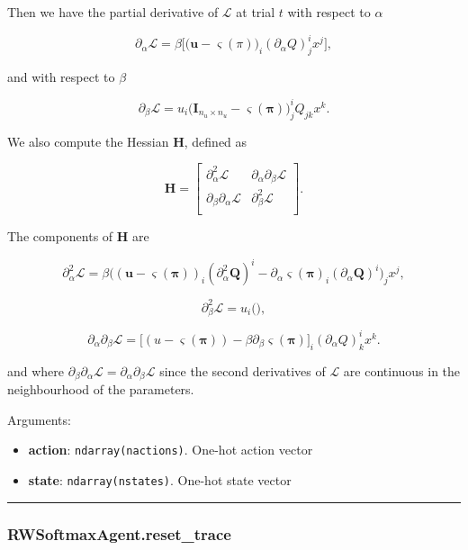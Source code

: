 Then we have the partial derivative of \(\mathcal L\) at trial \(t\)
with respect to \(\alpha\)

\[
\partial_{\alpha} \mathcal L = \beta \Big[ \big(\mathbf u - \varsigma(\pi)\big)_i (\partial_{\alpha} Q)^i_j x^j \Big],
\]

and with respect to \(\beta\)

\[
\partial_{\beta} \mathcal L = u_i \Big(\mathbf I_{n_u \times n_u} - \varsigma(\boldsymbol\pi)\Big)^i_j Q_{jk} x^k.
\]

We also compute the Hessian \(\mathbf H\), defined as

\[
\mathbf H = \left[
\begin{array}{cc}
\partial^2_{\alpha} \mathcal L & \partial_{\alpha} \partial_{\beta} \mathcal L \\
\partial_{\beta} \partial_{\alpha} \mathcal L & \partial^2_{\beta} \mathcal L \\
\end{array}\right].
\]

The components of \(\mathbf H\) are

\[
\partial^2_{\alpha} \mathcal L = \beta \Big( (\mathbf u - \varsigma(\boldsymbol\pi))_i (\partial^2_\alpha \mathbf Q)^i - \partial_{\alpha} \varsigma(\boldsymbol\pi)_i (\partial_{\alpha} \mathbf Q)^i \Big)_j x^j,
\]

\[
\partial^2_{\beta} \mathcal L = u_i \Big( \Big),
\]

\[
\partial_{\alpha} \partial_{\beta} \mathcal L = \Bigg[ (u - \varsigma(\boldsymbol\pi)) - \beta \partial_{\beta} \varsigma(\boldsymbol\pi) \Bigg]_i (\partial_{\alpha} Q)^i_k x^k.
\]

and where
\(\partial_{\beta} \partial_{\alpha} \mathcal L = \partial_{\alpha} \partial_{\beta} \mathcal L\)
since the second derivatives of \(\mathcal L\) are continuous in the
neighbourhood of the parameters.

Arguments:

\begin{itemize}
\tightlist
\item
  \textbf{action}: \texttt{ndarray(nactions)}. One-hot action vector
\item
  \textbf{state}: \texttt{ndarray(nstates)}. One-hot state vector
\end{itemize}

\begin{center}\rule{0.5\linewidth}{\linethickness}\end{center}

\subsubsection{RWSoftmaxAgent.reset\_trace}\label{rwsoftmaxagent.reset_trace}

